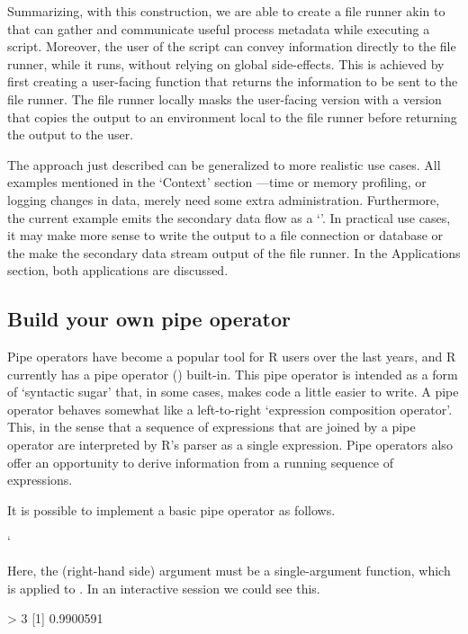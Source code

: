 Summarizing, with this construction, we are able to create a file runner akin to
 that can gather and communicate useful process metadata while
executing a script. Moreover, the user of the script can convey information
directly to the file runner, while it runs, without relying on global
side-effects. This is achieved by first creating a user-facing function that
returns the information to be sent to the file runner. The file runner locally
masks the user-facing version with a version that copies the output to an
environment local to the file runner before returning the output to the user. 

The approach just described can be generalized to more realistic use cases. All
examples mentioned in the `Context' section ---time or memory profiling, or
logging changes in data, merely need some extra administration.  Furthermore,
the current example emits the secondary data flow as a `'.  In
practical use cases, it may make more sense to write the output to a file
connection or database or the make the secondary data stream output of the
file runner. In the Applications section, both applications are discussed.


\subsection{Build your own pipe operator}
Pipe operators have become a popular tool for R users over the last years, and R
currently has a pipe operator (\code{|>}) built-in.  This pipe operator is
intended as a form of `syntactic sugar' that, in some cases, makes code a little
easier to write. A pipe operator behaves somewhat like a left-to-right
`expression composition operator'. This, in the sense that a sequence of
expressions that are joined by a pipe operator are interpreted by R's parser as
a single expression. Pipe operators also offer an opportunity to derive
information from a running sequence of expressions.

It is possible to implement a basic pipe operator as follows.
\begin{example}
  `%
\end{example}
Here, the  (right-hand side) argument must be a single-argument
function, which is applied to . In an interactive session we could
see this.
\begin{example}
  > 3 %
  [1] 0.9900591
\end{example}


